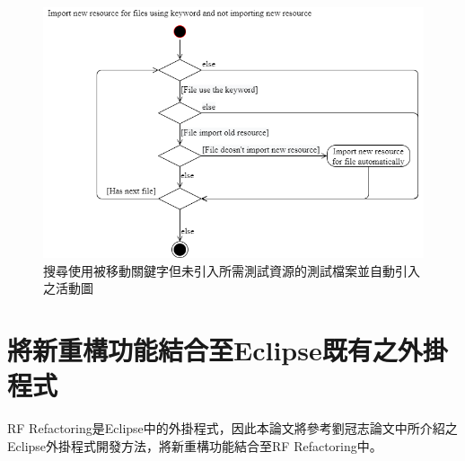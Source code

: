 \begin{figure}[H]
    \centering
    \includegraphics[width=1.0\textwidth]{picture/Import_resource_for_files_using_keyword_and_not_import_old_resource.png}
    \caption{搜尋使用被移動關鍵字但未引入所需測試資源的測試檔案並自動引入之活動圖}
    \label{f3.8}
\end{figure}

\section{將新重構功能結合至Eclipse既有之外掛程式}\label{s3.4}
\indent
RF Refactoring是Eclipse中的外掛程式，因此本論文將參考劉冠志論文\cite{LIU-Thesis}中所介紹之Eclipse外掛程式開發方法，將新重構功能結合至RF Refactoring中。



